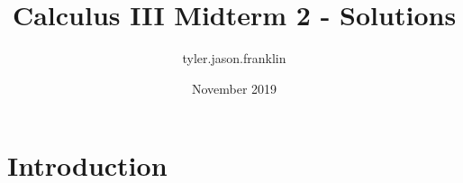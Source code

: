 \documentclass{article}
\title{Calculus III Midterm 2 - Solutions}
\author{tyler.jason.franklin }
\date{November 2019}
\begin{document}
\maketitle

\section{Introduction}
\end{document}
